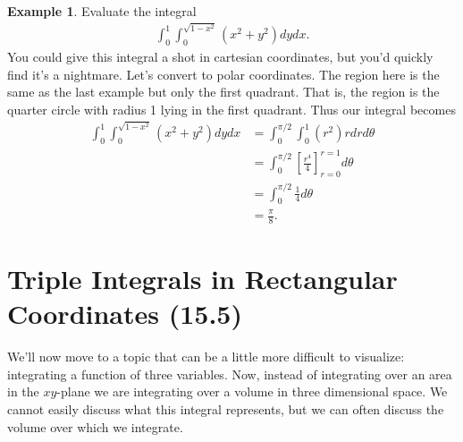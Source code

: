 \documentclass[12pt, letter]{article}
\theoremstyle{plain}
\numberwithin{theorem}{section}
\theoremstyle{definition}
\newtheorem{example}[theorem]{Example}
\begin{document}
\bigskip

\hrulefill

\bigskip

\begin{example}

Evaluate the integral
\begin{align*}
\int_0^1 \int_0^{\sqrt{1-x^2}} (x^2+y^2)dydx.
\end{align*}
You could give this integral a shot in cartesian coordinates, but you'd quickly find it's a nightmare. Let's convert to polar coordinates. The region here is the same as the last example but only the first quadrant. That is, the region is the quarter circle with radius 1 lying in the first quadrant. Thus our integral becomes
\begin{align*}
\int_0^1 \int_0^{\sqrt{1-x^2}} (x^2+y^2)dydx &= \int_0^{\pi/2} \int_0^1 (r^2)rdrd\theta\\
&= \int_0^{\pi/2} \left[ \frac{r^4}{4}\right]_{r=0}^{r=1} d\theta\\
&= \int_0^{\pi/2} \frac{1}{4} d\theta\\
&= \frac{\pi}{8}.
\end{align*}

\end{example}

\newpage


\section{Triple Integrals in Rectangular Coordinates (15.5)}

We'll now move to a topic that can be a little more difficult to visualize: integrating a function of three variables. Now, instead of integrating over an area in the $xy$-plane we are integrating over a volume in three dimensional space. We cannot easily discuss what this integral represents, but we can often discuss the volume over which we integrate.

\bigskip

\hrulefill

\bigskip
\end{document}

